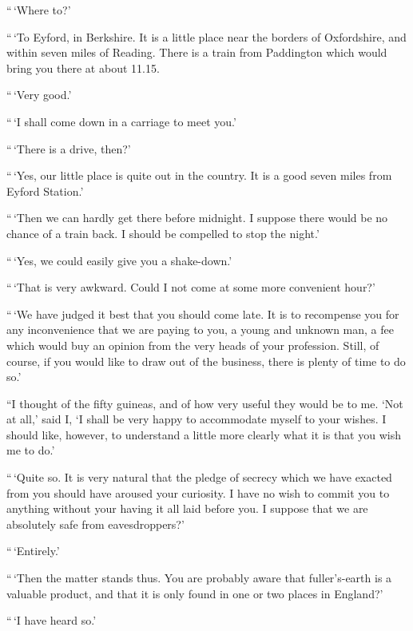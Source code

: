 “\,‘Where to?’

“\,‘To Eyford, in Berkshire. It is a little place near the
borders of Oxfordshire, and within seven miles of Reading.
There is a train from Paddington which would bring you
there at about 11.15.

“\,‘Very good.’

“\,‘I shall come down in a carriage to meet you.’

“\,‘There is a drive, then?’

“\,‘Yes, our little place is quite out in the country. It is a
good seven miles from Eyford Station.’

“\,‘Then we can hardly get there before midnight. I suppose
there would be no chance of a train back. I should be
compelled to stop the night.’

“\,‘Yes, we could easily give you a shake-down.’

“\,‘That is very awkward. Could I not come at some more
convenient hour?’

“\,‘We have judged it best that you should come late. It is
to recompense you for any inconvenience that we are paying
to you, a young and unknown man, a fee which would buy an
opinion from the very heads of your profession. Still, of
course, if you would like to draw out of the business, there is
plenty of time to do so.’

“I thought of the fifty guineas, and of how very useful they
would be to me. ‘Not at all,’ said I, ‘I shall be very happy
to accommodate myself to your wishes. I should like, however,
to understand a little more clearly what it is that you
wish me to do.’

“\,‘Quite so. It is very natural that the pledge of secrecy
which we have exacted from you should have aroused your
curiosity. I have no wish to commit you to anything without
your having it all laid before you. I suppose that we are
absolutely safe from eavesdroppers?’

“\,‘Entirely.’

“\,‘Then the matter stands thus. You are probably aware
that fuller’s-earth is a valuable product, and that it is only
found in one or two places in England?’

“\,‘I have heard so.’

